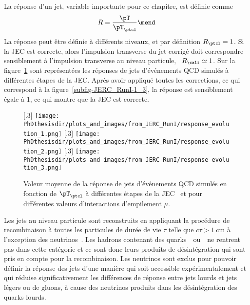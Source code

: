 La réponse d'un jet, variable importante pour ce chapitre, est définie comme
\begin{equation}
R = \frac{\pT}{\pT_\ptcl}
\mend
\end{equation}
La réponse peut être définie à différents niveaux, et par définition $R_\ptcl=1$.
Si la JEC est correcte, alors l'impulsion transverse du jet corrigé doit correspondre sensiblement à l'impulsion transverse au niveau particule, \ie\ $R_\cali\simeq1$.
Sur la figure~\ref{fig-JERC_RunI-1} sont représentées les réponses de jets d'événements QCD simulés à différentes étapes de la JEC. Après avoir appliqué toutes les corrections, ce qui correspond à la figure~\ref{subfig-JERC_RunI-1_3}, la réponse est sensiblement égale à 1, ce qui montre que la JEC est correcte.
\begin{figure}[h]
\centering
{}[.3\textwidth]
{\texttt{[image: \\PhDthesisdir/plots\_and\_images/from\_JERC\_RunI/response\_evolution\_1.png]}}
\hfill
{}[.3\textwidth]
{\texttt{[image: \\PhDthesisdir/plots\_and\_images/from\_JERC\_RunI/response\_evolution\_2.png]}}
\hfill
{}[.3\textwidth]
{\texttt{[image: \\PhDthesisdir/plots\_and\_images/from\_JERC\_RunI/response\_evolution\_3.png]}}
\caption[Valeur moyenne de la réponse de jets d'événements QCD simulés.]{Valeur moyenne de la réponse de jets d'événements QCD simulés en fonction de $\pT_\ptcl$ à différentes étapes de la JEC~\cite{JERC_RunI} et pour différentes valeurs d'interactions d'empilement $\mu$.}
\label{fig-JERC_RunI-1}
\end{figure}
\par Les jets au niveau particule sont reconstruits en appliquant la procédure de recombinaison à toutes les particules de durée de vie $\tau$ telle que $c\tau>\SI{1}{\centi\meter}$ à l'exception des neutrinos~\cite{JERC_RunI}.
Les hadrons contenant des quarks~\quarkc\ ou~\quarkb\ ne rentrent pas dans cette catégorie et ce sont donc leurs produits de désintégration qui sont pris en compte pour la recombinaison.
Les neutrinos sont exclus pour pouvoir définir la réponse des jets d'une manière qui soit accessible expérimentalement et qui réduise significativement les différences de réponse entre jets lourds et jets légers ou de gluons, à cause des neutrinos produits dans les désintégration des quarks lourds.
